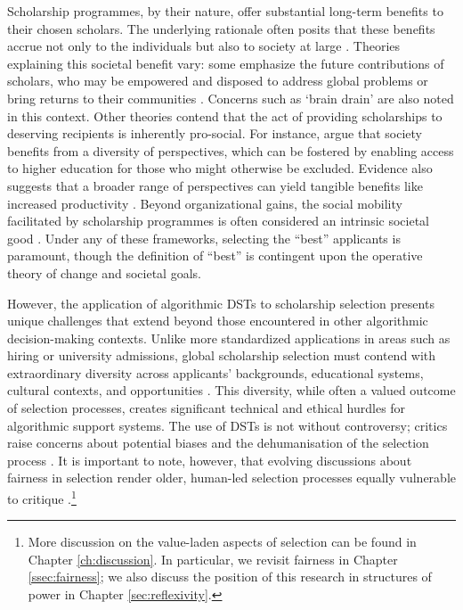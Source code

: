 Scholarship programmes, by their nature, offer substantial long-term benefits to their chosen scholars. The underlying rationale often posits that these benefits accrue not only to the individuals but also to society at large \cite{DilraboJonbekova_Ruby_2023,Dassin_Marsh_Mawer_2018}. Theories explaining this societal benefit vary: some emphasize the future contributions of scholars, who may be empowered and disposed to address global problems or bring returns to their communities \cite{Dassin_Marsh_Mawer_2018}. Concerns such as `brain drain' are also noted in this context. Other theories contend that the act of providing scholarships to deserving recipients is inherently pro-social. For instance, \textcite{minkin2023diversity} argue that society benefits from a diversity of perspectives, which can be fostered by enabling access to higher education for those who might otherwise be excluded. Evidence also suggests that a broader range of perspectives can yield tangible benefits like increased productivity \cite{autor2008does,noray2023systemic}. Beyond organizational gains, the social mobility facilitated by scholarship programmes is often considered an intrinsic societal good \cite{Dassin_Marsh_Mawer_2018}. Under any of these frameworks, selecting the ``best'' applicants is paramount, though the definition of ``best'' is contingent upon the operative theory of change and societal goals.

However, the application of algorithmic DSTs to scholarship selection presents unique challenges that extend beyond those encountered in other algorithmic decision-making contexts. Unlike more standardized applications in areas such as hiring or university admissions, global scholarship selection must contend with extraordinary diversity across applicants' backgrounds, educational systems, cultural contexts, and opportunities \cite{Warikoo_2019}. This diversity, while often a valued outcome of selection processes, creates significant technical and ethical hurdles for algorithmic support systems. The use of DSTs is not without controversy; critics raise concerns about potential biases \cite{dwork_fairness_2012} and the dehumanisation of the selection process \cite{binns_its_2018}. It is important to note, however, that evolving discussions about fairness in selection render older, human-led selection processes equally vulnerable to critique \cite{Ahnaf2023AHPAP,pmlr-v80-kearns18a}.\footnote{More discussion on the value-laden aspects of selection can be found in Chapter \ref{ch:discussion}. In particular, we revisit fairness in Chapter \ref{ssec:fairness}; we also discuss the position of this research in structures of power in Chapter \ref{sec:reflexivity}.}

